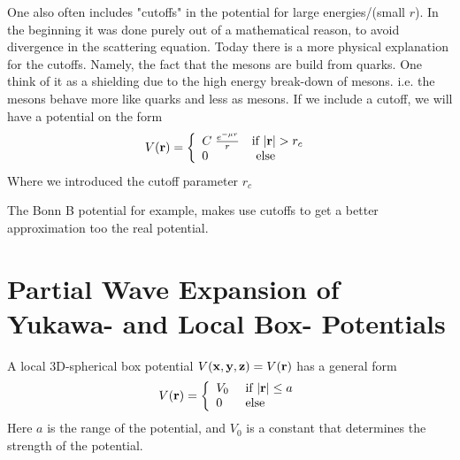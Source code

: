 One also often includes "cutoffs" in the potential for large energies/(small $r$). 
In the beginning it was done purely out of a mathematical reason,
to avoid divergence in the scattering equation. Today there is a more physical explanation for the cutoffs. Namely,
the fact that the mesons are build from quarks.
One think of it as a shielding due to the high energy break-down of mesons.
i.e. the mesons behave more like quarks and less as mesons.
If we include a cutoff, we will have a potential on the form
\begin{equation}
V({\bf r})=
\left\{
\begin{array}{ll}
C\;\frac{e^{-{ \mu r}}}{{ r}} & \textrm{if $|{\bf r}|> r_{c}$ }\\
0 & \textrm{ else}
\end{array}
\right.
\end{equation}
Where we introduced the cutoff parameter ${r_{c}}$

The Bonn B potential for example, makes use cutoffs to get a better approximation too the real potential.












\section[Partial Wave Expansion of Potentials]{Partial Wave Expansion of Yukawa- and  Local Box- Potentials} 

A local 3D-spherical box potential $V({\bf x},{\bf y},{\bf z})=V({\bf r})$  has a general form 
\begin{equation}  
V({\bf r})= 
\left\{ 
\begin{array}{ll}
V_0 &\textrm{ if $|{\bf r}|\le a $} \\
0 &\textrm{ else }
\end{array}
\right.
\end{equation}  
%
Here $a$ is the range of the potential, and $V_0$ is a constant that determines the strength of
the potential.

